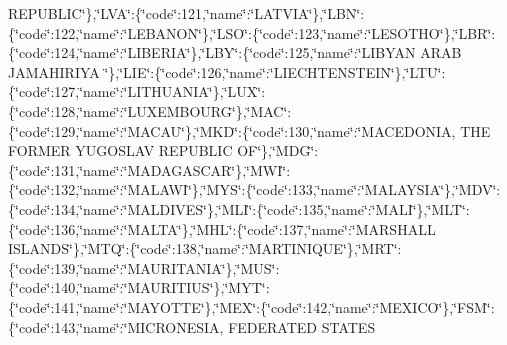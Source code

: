 {R\-E\-P\-U\-B\-L\-I\-C\char`\"{}\},\char`\"{}L\-V\-A\char`\"{}\-:\{\char`\"{}code\char`\"{}\-:121,\char`\"{}name\char`\"{}\-:\char`\"{}L\-A\-T\-V\-I\-A\char`\"{}\},\char`\"{}L\-B\-N\char`\"{}\-:\{\char`\"{}code\char`\"{}\-:122,\char`\"{}name\char`\"{}\-:\char`\"{}L\-E\-B\-A\-N\-O\-N\char`\"{}\},\char`\"{}L\-S\-O\char`\"{}\-:\{\char`\"{}code\char`\"{}\-:123,\char`\"{}name\char`\"{}\-:\char`\"{}L\-E\-S\-O\-T\-H\-O\char`\"{}\},\char`\"{}L\-B\-R\char`\"{}\-:\{\char`\"{}code\char`\"{}\-:124,\char`\"{}name\char`\"{}\-:\char`\"{}L\-I\-B\-E\-R\-I\-A\char`\"{}\},\char`\"{}L\-B\-Y\char`\"{}\-:\{\char`\"{}code\char`\"{}\-:125,\char`\"{}name\char`\"{}\-:\char`\"{}L\-I\-B\-Y\-A\-N A\-R\-A\-B J\-A\-M\-A\-H\-I\-R\-I\-Y\-A \char`\"{}\},\char`\"{}L\-I\-E\char`\"{}\-:\{\char`\"{}code\char`\"{}\-:126,\char`\"{}name\char`\"{}\-:\char`\"{}L\-I\-E\-C\-H\-T\-E\-N\-S\-T\-E\-I\-N\char`\"{}\},\char`\"{}L\-T\-U\char`\"{}\-:\{\char`\"{}code\char`\"{}\-:127,\char`\"{}name\char`\"{}\-:\char`\"{}L\-I\-T\-H\-U\-A\-N\-I\-A\char`\"{}\},\char`\"{}L\-U\-X\char`\"{}\-:\{\char`\"{}code\char`\"{}\-:128,\char`\"{}name\char`\"{}\-:\char`\"{}L\-U\-X\-E\-M\-B\-O\-U\-R\-G\char`\"{}\},\char`\"{}M\-A\-C\char`\"{}\-:\{\char`\"{}code\char`\"{}\-:129,\char`\"{}name\char`\"{}\-:\char`\"{}M\-A\-C\-A\-U\char`\"{}\},\char`\"{}M\-K\-D\char`\"{}\-:\{\char`\"{}code\char`\"{}\-:130,\char`\"{}name\char`\"{}\-:\char`\"{}M\-A\-C\-E\-D\-O\-N\-I\-A, T\-H\-E F\-O\-R\-M\-E\-R Y\-U\-G\-O\-S\-L\-A\-V R\-E\-P\-U\-B\-L\-I\-C O\-F\char`\"{}\},\char`\"{}M\-D\-G\char`\"{}\-:\{\char`\"{}code\char`\"{}\-:131,\char`\"{}name\char`\"{}\-:\char`\"{}M\-A\-D\-A\-G\-A\-S\-C\-A\-R\char`\"{}\},\char`\"{}M\-W\-I\char`\"{}\-:\{\char`\"{}code\char`\"{}\-:132,\char`\"{}name\char`\"{}\-:\char`\"{}M\-A\-L\-A\-W\-I\char`\"{}\},\char`\"{}M\-Y\-S\char`\"{}\-:\{\char`\"{}code\char`\"{}\-:133,\char`\"{}name\char`\"{}\-:\char`\"{}M\-A\-L\-A\-Y\-S\-I\-A\char`\"{}\},\char`\"{}M\-D\-V\char`\"{}\-:\{\char`\"{}code\char`\"{}\-:134,\char`\"{}name\char`\"{}\-:\char`\"{}M\-A\-L\-D\-I\-V\-E\-S\char`\"{}\},\char`\"{}M\-L\-I\char`\"{}\-:\{\char`\"{}code\char`\"{}\-:135,\char`\"{}name\char`\"{}\-:\char`\"{}M\-A\-L\-I\char`\"{}\},\char`\"{}M\-L\-T\char`\"{}\-:\{\char`\"{}code\char`\"{}\-:136,\char`\"{}name\char`\"{}\-:\char`\"{}M\-A\-L\-T\-A\char`\"{}\},\char`\"{}M\-H\-L\char`\"{}\-:\{\char`\"{}code\char`\"{}\-:137,\char`\"{}name\char`\"{}\-:\char`\"{}M\-A\-R\-S\-H\-A\-L\-L I\-S\-L\-A\-N\-D\-S\char`\"{}\},\char`\"{}M\-T\-Q\char`\"{}\-:\{\char`\"{}code\char`\"{}\-:138,\char`\"{}name\char`\"{}\-:\char`\"{}M\-A\-R\-T\-I\-N\-I\-Q\-U\-E\char`\"{}\},\char`\"{}M\-R\-T\char`\"{}\-:\{\char`\"{}code\char`\"{}\-:139,\char`\"{}name\char`\"{}\-:\char`\"{}M\-A\-U\-R\-I\-T\-A\-N\-I\-A\char`\"{}\},\char`\"{}M\-U\-S\char`\"{}\-:\{\char`\"{}code\char`\"{}\-:140,\char`\"{}name\char`\"{}\-:\char`\"{}M\-A\-U\-R\-I\-T\-I\-U\-S\char`\"{}\},\char`\"{}M\-Y\-T\char`\"{}\-:\{\char`\"{}code\char`\"{}\-:141,\char`\"{}name\char`\"{}\-:\char`\"{}M\-A\-Y\-O\-T\-T\-E\char`\"{}\},\char`\"{}M\-E\-X\char`\"{}\-:\{\char`\"{}code\char`\"{}\-:142,\char`\"{}name\char`\"{}\-:\char`\"{}M\-E\-X\-I\-C\-O\char`\"{}\},\char`\"{}F\-S\-M\char`\"{}\-:\{\char`\"{}code\char`\"{}\-:143,\char`\"{}name\char`\"{}\-:\char`\"{}M\-I\-C\-R\-O\-N\-E\-S\-I\-A, F\-E\-D\-E\-R\-A\-T\-E\-D S\-T\-A\-T\-E\-S }
